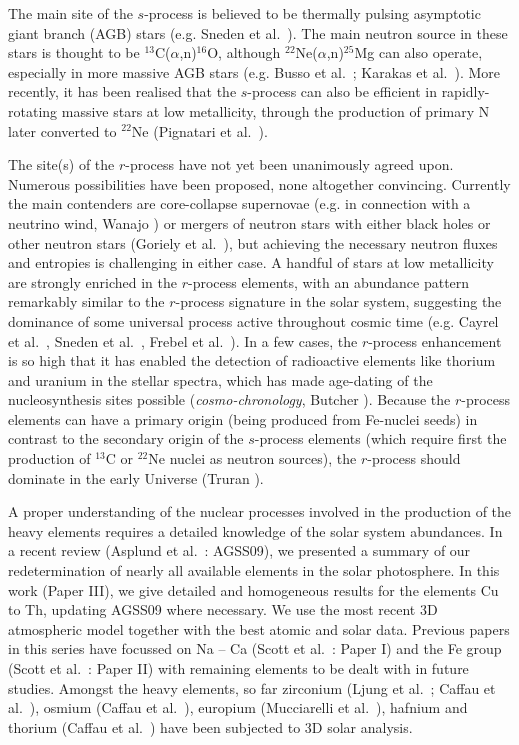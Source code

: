 \documentclass[traditabstract]{aa}
\begin{document}
The main site of the $s$-process is believed to be thermally pulsing asymptotic giant branch (AGB) stars (e.g. Sneden et al.\ \cite{2008ARA&A..46..241S}).  The main neutron source in these stars is thought to be $^{13}$C($\alpha$,n)$^{16}$O, although $^{22}$Ne($\alpha$,n)$^{25}$Mg can also operate, especially in more massive AGB stars (e.g. Busso et al.\ \cite{2001ApJ...557..802B}; Karakas et al.\ \cite{2012ApJ...751....8K}). More recently, it has been realised that the $s$-process can also be efficient in rapidly-rotating massive stars at low metallicity, through the production of primary N later converted to $^{22}$Ne (Pignatari et al.\ \cite{2008ApJ...687L..95P}).

The site(s) of the $r$-process have not yet been unanimously agreed upon. Numerous possibilities have been proposed, none altogether convincing. Currently the main contenders are core-collapse supernovae (e.g. in connection with a neutrino wind, Wanajo \cite{2013ApJ...770L..22W}) or mergers of neutron stars with either black holes or other neutron stars (Goriely et al.\ \cite{2011ApJ...738L..32G}), but achieving the necessary neutron fluxes and entropies is challenging in either case. A handful of stars at low metallicity are strongly enriched in the $r$-process elements, with an abundance pattern remarkably similar to the $r$-process signature in the solar system, suggesting the dominance of some universal process active throughout cosmic time (e.g. Cayrel et al.\ \cite{2001Natur.409..691C}, Sneden et al.\ \cite{2003ApJ...591..936S}, Frebel et al.\ \cite{2007ApJ...660L.117F}). In a few cases, the $r$-process enhancement is so high that it has enabled the detection of radioactive elements like thorium and uranium in the stellar spectra, which has made age-dating of the nucleosynthesis sites possible ({\it cosmo-chronology}, Butcher \cite{1987Natur.328..127B}). Because the $r$-process elements can have a primary origin (being produced from Fe-nuclei seeds) in contrast to the secondary origin of the $s$-process elements (which require first the production of $^{13}$C or $^{22}$Ne nuclei as neutron sources), the $r$-process should dominate in the early Universe (Truran \cite{1981A&A....97..391T}). 

A proper understanding of the nuclear processes involved in the production of the heavy elements requires a detailed knowledge of the solar system abundances.  In a recent review (Asplund et al.\ \cite{asp8}: AGSS09), we presented a summary of our redetermination of nearly all available elements in the solar photosphere. In this work (Paper III), we give detailed and homogeneous results for the elements Cu to Th, updating AGSS09 where necessary.  We use the most recent 3D atmospheric model together with the best atomic and solar data.  Previous papers in this series have focussed on Na -- Ca (Scott et al.\ \cite{AGSS_NaCa}: Paper I) and the Fe group (Scott et al.\ \cite{AGSS_Fegroup}: Paper II) with remaining elements to be dealt with in future studies.  Amongst the heavy elements, so far zirconium (Ljung et al.\ \cite{ljung}; Caffau et al.\ \cite{caf1}), osmium (Caffau et al.\ \cite{caf3}), europium (Mucciarelli et al.\ \cite{mucc}), hafnium and thorium (Caffau et al.\ \cite{caf2}) have been subjected to 3D solar analysis.
\end{document}
